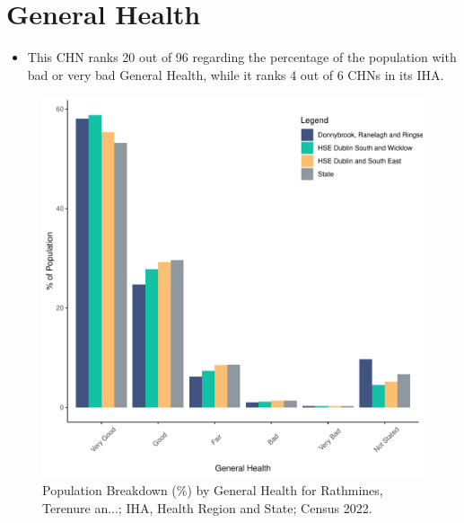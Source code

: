 \documentclass{article}
\begin{document}
\pagebreak

\section{General Health}\label{sect:GenHealth}
\begin{itemize}
\item  This CHN ranks  20 out of 96 regarding the percentage of the population with bad or very bad General Health, while it ranks   4 out of 6 CHNs in its IHA.
\end{itemize}
\begin{figure}[h]
	\centering
	\includegraphics[width = 150mm]{../figures/GenED.pdf}
	\caption{Population Breakdown (\%) by General Health for Rathmines, Terenure an...; IHA, Health Region and State;  Census 2022.}
	\label{fig:2ae19629-1a6a-13a3-e055-000000000001}
	\end{figure}
\end{document}
